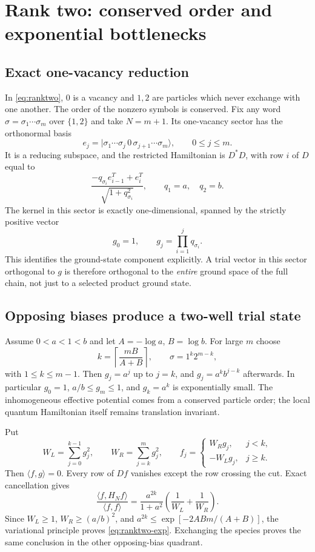 \documentclass[11pt,a4paper]{article}
\theoremstyle{remark}\newtheorem{remark}[theorem]{Remark}
\newcommand{\ket}[1]{\lvert #1\rangle}
\begin{document}
\section{Rank two: conserved order and exponential bottlenecks}\label{sec:ranktwo}
\subsection{Exact one-vacancy reduction}
In \eqref{eq:ranktwo}, $0$ is a vacancy and $1,2$ are particles which never exchange with one another. The order of the nonzero symbols is conserved. Fix any word $\sigma=\sigma_1\cdots\sigma_m$ over $\{1,2\}$ and take $N=m+1$. Its one-vacancy sector has the orthonormal basis
\[
 e_j=\ket{\sigma_1\cdots\sigma_j\,0\,\sigma_{j+1}\cdots\sigma_m},
 \qquad0\le j\le m.
\]
It is a reducing subspace, and the restricted Hamiltonian is $D^*D$, with row $i$ of $D$ equal to
\begin{equation}\label{eq:vacancyD}
 \frac{-q_{\sigma_i}e_{i-1}^T+e_i^T}{\sqrt{1+q_{\sigma_i}^2}},
 \qquad q_1=a,\quad q_2=b.
\end{equation}
The kernel in this sector is exactly one-dimensional, spanned by the strictly positive vector
\begin{equation}\label{eq:g}
 g_0=1,\qquad g_j=\prod_{i=1}^j q_{\sigma_i}.
\end{equation}
This identifies the ground-state component explicitly. A trial vector in this sector orthogonal to $g$ is therefore orthogonal to the \emph{entire} ground space of the full chain, not just to a selected product ground state.

\subsection{Opposing biases produce a two-well trial state}
Assume $0<a<1<b$ and let $A=-\log a$, $B=\log b$. For large $m$ choose
\[
 k=\left\lceil\frac{mB}{A+B}\right\rceil,\qquad
 \sigma=1^k2^{m-k},
\]
with $1\le k\le m-1$. Then $g_j=a^j$ up to $j=k$, and
$g_j=a^k b^{j-k}$ afterwards. In particular $g_0=1$, $a/b\le g_m\le1$, and $g_k=a^k$ is exponentially small. The inhomogeneous effective potential comes from a conserved particle order; the local quantum Hamiltonian itself remains translation invariant.

Put
\[
 W_L=\sum_{j=0}^{k-1}g_j^2,\qquad W_R=\sum_{j=k}^{m}g_j^2,
 \qquad
 f_j=\begin{cases}W_Rg_j,&j<k,\\-W_Lg_j,&j\ge k.\end{cases}
\]
Then $\langle f,g\rangle=0$. Every row of $Df$ vanishes except the row crossing the cut. Exact cancellation gives
\begin{equation}\label{eq:rayleigh}
 \frac{\langle f,H_N f\rangle}{\langle f,f\rangle}
 =\frac{a^{2k}}{1+a^2}\left(\frac1{W_L}+\frac1{W_R}\right).
\end{equation}
Since $W_L\ge1$, $W_R\ge(a/b)^2$, and
$a^{2k}\le\exp[-2ABm/(A+B)]$, the variational principle proves \eqref{eq:ranktwo-exp}. Exchanging the species proves the same conclusion in the other opposing-bias quadrant.
\end{document}
